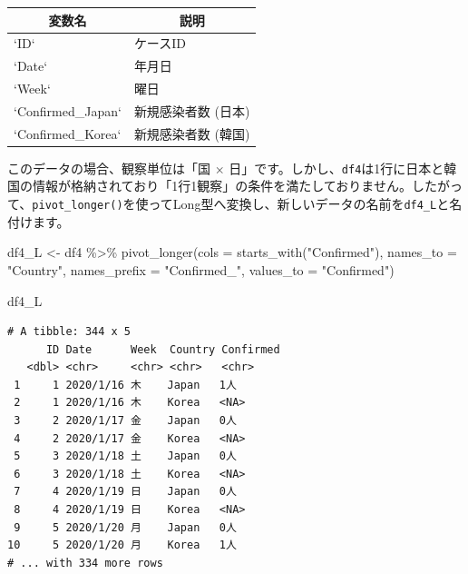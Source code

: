 \documentclass[
  a4paper,
  pandoc,
  ja=standard,
  jafont=haranoaji]{bxjsbook}
\newenvironment{Shaded}{\begin{snugshade}}{\end{snugshade}}
\newcommand{\AttributeTok}[1]{\textcolor[rgb]{0.00,0.48,0.65}{#1}}
\newcommand{\FunctionTok}[1]{\textcolor[rgb]{0.28,0.35,0.67}{#1}}
\newcommand{\NormalTok}[1]{\textcolor[rgb]{0.00,0.48,0.65}{#1}}
\newcommand{\OtherTok}[1]{\textcolor[rgb]{0.00,0.48,0.65}{#1}}
\newcommand{\SpecialCharTok}[1]{\textcolor[rgb]{0.37,0.37,0.37}{#1}}
\newcommand{\StringTok}[1]{\textcolor[rgb]{0.13,0.47,0.30}{#1}}
\begin{document}
\begin{table}
\centering
\begin{tabular}{l|l}
\hline
\multicolumn{1}{c}{変数名} & \multicolumn{1}{c}{説明}\\
\hline
`ID` & ケースID\\
\hline
`Date` & 年月日\\
\hline
`Week` & 曜日\\
\hline
`Confirmed\_Japan` & 新規感染者数 (日本)\\
\hline
`Confirmed\_Korea` & 新規感染者数 (韓国)\\
\hline
\end{tabular}
\end{table}

このデータの場合、観察単位は「国 \(\times\)
日」です。しかし、\texttt{df4}は1行に日本と韓国の情報が格納されており「1行1観察」の条件を満たしておりません。したがって、\texttt{pivot\_longer()}を使ってLong型へ変換し、新しいデータの名前を\texttt{df4\_L}と名付けます。

\begin{Shaded}
\begin{Highlighting}[numbers=left,,]
\NormalTok{df4\_L }\OtherTok{\textless{}{-}}\NormalTok{ df4 }\SpecialCharTok{\%\textgreater{}\%}
  \FunctionTok{pivot\_longer}\NormalTok{(}\AttributeTok{cols         =} \FunctionTok{starts\_with}\NormalTok{(}\StringTok{"Confirmed"}\NormalTok{), }
               \AttributeTok{names\_to     =} \StringTok{"Country"}\NormalTok{,}
               \AttributeTok{names\_prefix =} \StringTok{"Confirmed\_"}\NormalTok{,}
               \AttributeTok{values\_to    =} \StringTok{"Confirmed"}\NormalTok{)}

\NormalTok{df4\_L}
\end{Highlighting}
\end{Shaded}

\begin{verbatim}
# A tibble: 344 x 5
      ID Date      Week  Country Confirmed
   <dbl> <chr>     <chr> <chr>   <chr>    
 1     1 2020/1/16 木    Japan   1人      
 2     1 2020/1/16 木    Korea   <NA>     
 3     2 2020/1/17 金    Japan   0人      
 4     2 2020/1/17 金    Korea   <NA>     
 5     3 2020/1/18 土    Japan   0人      
 6     3 2020/1/18 土    Korea   <NA>     
 7     4 2020/1/19 日    Japan   0人      
 8     4 2020/1/19 日    Korea   <NA>     
 9     5 2020/1/20 月    Japan   0人      
10     5 2020/1/20 月    Korea   1人      
# ... with 334 more rows
\end{verbatim}
\end{document}

